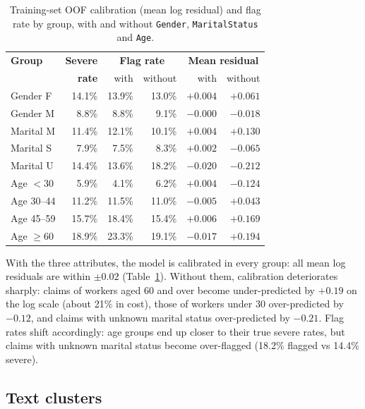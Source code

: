 \documentclass[10pt,twocolumn,letterpaper]{article}
\begin{document}
\begin{table}[t]
\centering
\caption{Training-set OOF calibration (mean log residual) and flag rate by group, with and without \texttt{Gender},
\texttt{MaritalStatus} and \texttt{Age}.}
\label{tab:fair}
\footnotesize
\setlength{\tabcolsep}{2.5pt}
\begin{tabular}{@{}lrrrrr@{}}
\toprule
\textbf{Group} & \textbf{Severe} & \multicolumn{2}{c}{\textbf{Flag rate}} & \multicolumn{2}{c}{\textbf{Mean residual}} \\
 & \textbf{rate} & with & without & with & without \\
\midrule
Gender F            & 14.1\% & 13.9\% & 13.0\% & $+0.004$ & $+0.061$ \\
Gender M            & 8.8\%  & 8.8\%  & 9.1\%  & $-0.000$ & $-0.018$ \\
Marital M           & 11.4\% & 12.1\% & 10.1\% & $+0.004$ & $+0.130$ \\
Marital S           & 7.9\%  & 7.5\%  & 8.3\%  & $+0.002$ & $-0.065$ \\
Marital U           & 14.4\% & 13.6\% & 18.2\% & $-0.020$ & $-0.212$ \\
Age $<30$           & 5.9\%  & 4.1\%  & 6.2\%  & $+0.004$ & $-0.124$ \\
Age 30--44          & 11.2\% & 11.5\% & 11.0\% & $-0.005$ & $+0.043$ \\
Age 45--59          & 15.7\% & 18.4\% & 15.4\% & $+0.006$ & $+0.169$ \\
Age $\ge 60$        & 18.9\% & 23.3\% & 19.1\% & $-0.017$ & $+0.194$ \\
\bottomrule
\end{tabular}
\end{table}

With the three attributes, the model is calibrated in every group: all mean log residuals are within $\pm0.02$
(Table~\ref{tab:fair}). Without them, calibration deteriorates sharply: claims of workers aged 60 and over become
under-predicted by $+0.19$ on the log scale (about 21\% in cost), those of workers under 30 over-predicted by $-0.12$, and
claims with unknown marital status over-predicted by $-0.21$. Flag rates shift accordingly: age groups end up closer
to their true severe rates, but claims with unknown marital status become over-flagged (18.2\% flagged vs 14.4\%
severe).

\subsection{Text clusters}
\end{document}
